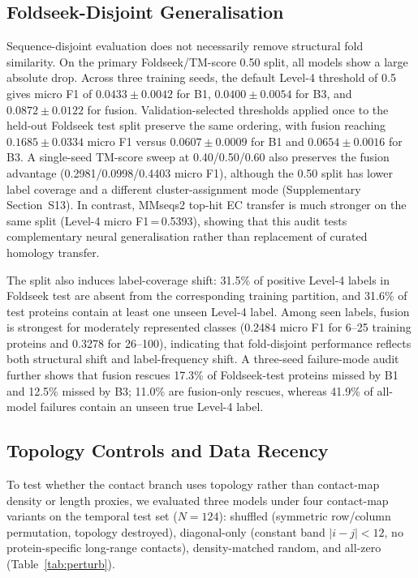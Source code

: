 \documentclass[namedate,contemporary,mediumone]{oup-authoring-template}
\begin{document}
\subsection{Foldseek-Disjoint Generalisation}

Sequence-disjoint evaluation does not necessarily remove structural fold
similarity. On the primary Foldseek/TM-score 0.50 split, all models show a large
absolute drop. Across three training seeds, the default Level-4 threshold of 0.5
gives micro F1 of $0.0433\pm0.0042$ for B1, $0.0400\pm0.0054$ for B3, and
$0.0872\pm0.0122$ for fusion. Validation-selected thresholds applied once to the
held-out Foldseek test split preserve the same ordering, with fusion reaching
$0.1685\pm0.0334$ micro F1 versus $0.0607\pm0.0009$ for B1 and
$0.0654\pm0.0016$ for B3. A single-seed TM-score sweep at 0.40/0.50/0.60 also
preserves the fusion advantage (0.2981/0.0998/0.4403 micro F1), although the
0.50 split has lower label coverage and a different cluster-assignment mode
(Supplementary Section~S13). In contrast, MMseqs2 top-hit EC transfer is much
stronger on the same split (Level-4 micro F1\,=\,0.5393), showing that this audit
tests complementary neural generalisation rather than replacement of curated
homology transfer.

The split also induces label-coverage shift: 31.5\% of positive Level-4 labels
in Foldseek test are absent from the corresponding training partition, and
31.6\% of test proteins contain at least one unseen Level-4 label. Among seen
labels, fusion is strongest for moderately represented classes (0.2484 micro F1
for 6--25 training proteins and 0.3278 for 26--100), indicating that
fold-disjoint performance reflects both structural shift and label-frequency
shift. A three-seed failure-mode audit further shows that fusion rescues 17.3\%
of Foldseek-test proteins missed by B1 and 12.5\% missed by B3; 11.0\% are
fusion-only rescues, whereas 41.9\% of all-model failures contain an unseen true
Level-4 label.

\subsection{Topology Controls and Data Recency}

To test whether the contact branch uses topology rather than contact-map density or
length proxies, we evaluated three models under four contact-map variants on the
temporal test set ($N=124$): shuffled (symmetric row/column permutation, topology
destroyed), diagonal-only (constant band $|i-j|<12$, no protein-specific
long-range contacts), density-matched random, and all-zero
(Table~\ref{tab:perturb}).
\end{document}
